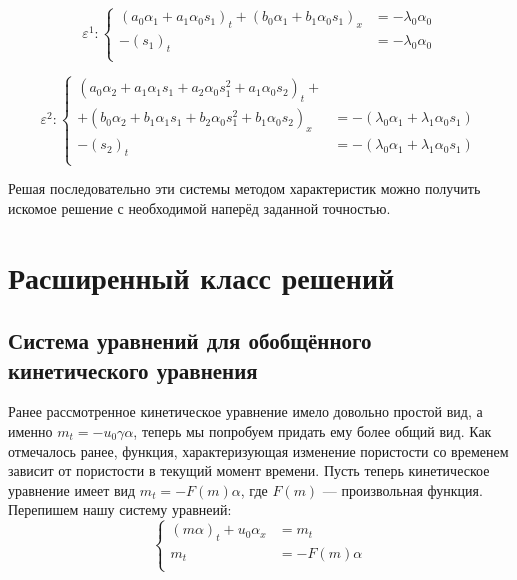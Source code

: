 \documentclass[a4paper,12pt]{article}
\begin{document}
\begin{equation*}
\varepsilon^{1}: 
\begin{cases}
(a_{0}\alpha_{1}+a_{1}\alpha_{0}s_{1})_{t}+(b_{0}\alpha_{1}+b_{1}\alpha_{0} s_{1})_{x}&= -\lambda_{0} \alpha_{0}\\
-(s_{1})_{t}&= - \lambda_{0} \alpha_{0}\\
\end{cases}
\end{equation*}

\begin{equation*}
\varepsilon^{2}: 
\begin{cases}
(a_{0}\alpha_{2}+a_{1}\alpha_{1}s_{1}+a_{2}\alpha_{0} s_{1}^{2}+a_{1}\alpha_{0}s_{2})_{t}+\\+(b_{0}\alpha_{2}+b_{1}\alpha_{1} s_{1}+b_{2}\alpha_{0}s_{1}^{2}+b_{1}\alpha_{0} s_{2})_{x}&= -(\lambda_{0} \alpha_{1}+\lambda_{1}\alpha_{0}s_{1})\\
-(s_{2})_{t}&= - (\lambda_{0} \alpha_{1}+\lambda_{1}\alpha_{0}s_{1})\\
\end{cases}
\end{equation*}

\par Решая последовательно эти системы методом характеристик можно получить искомое решение с необходимой наперёд заданной точностью.

\pagebreak

\section{Расширенный класс решений}
\subsection{Система уравнений для обобщённого кинетического уравнения}
\par Ранее рассмотренное кинетическое уравнение имело довольно простой вид, а именно $m_{t} = -u_{0}\gamma \alpha$, теперь мы попробуем придать ему более общий вид. Как отмечалось ранее, функция, характеризующая изменение пористости со временем зависит от пористости в текущий момент времени. Пусть теперь кинетическое уравнение имеет вид $m_{t} = -F(m)\alpha$, где $F(m)$ --- произвольная функция. Перепишем нашу систему уравнеий:
\begin{equation*}
\begin{cases}

(m\alpha)_{t}+ u_{0}\alpha_{x} &= m_{t}\\
m_{t} &= -F(m)\alpha\\

\end{cases}
\end{equation*}
\end{document}
